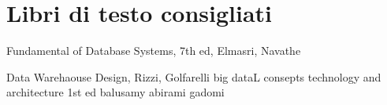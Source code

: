 
\section{Libri di testo consigliati}
\itemize{}
	\item Fundamental of Database Systems, 7th ed, Elmasri, Navathe
	\item Data Warehaouse Design, Rizzi, Golfarelli
big dataL consepts technology and architecture 1st ed balusamy abirami gadomi
